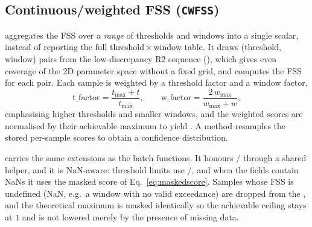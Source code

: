 \subsection{Continuous/weighted FSS (\texttt{CWFSS})}
\label{sec:cwfss}

 aggregates the FSS over a \emph{range} of thresholds and
windows into a single scalar, instead of reporting the full
threshold\,$\times$\,window table. It draws  (threshold,
window) pairs from the low-discrepancy R2 sequence (), which gives
even coverage of the 2D parameter space without a fixed grid, and computes the
FSS for each pair. Each sample is weighted by a threshold factor and a window
factor,
%
\begin{equation}
  \text{t\_factor} = \frac{t_\text{max}+t}{t_\text{max}},
  \qquad
  \text{w\_factor} = \frac{2\,w_\text{max}}{w_\text{max}+w},
\end{equation}
%
emphasising higher thresholds and smaller windows, and the weighted scores are
normalised by their achievable maximum to yield . A
 method resamples the stored per-sample scores to obtain a
confidence distribution.

 carries the same extensions as the batch functions. It honours
/ through a shared
 helper, and it is NaN-aware: threshold limits use
/, and when the fields contain
NaNs it uses the masked score of Eq.~\eqref{eq:maskedscore}. Samples whose FSS
is undefined (NaN, e.g.\ a window with no valid exceedance) are dropped from the
, and the theoretical maximum is masked identically so the
achievable ceiling stays at $1$ and is not lowered merely by the presence of
missing data.
